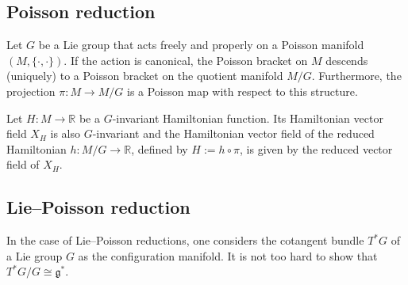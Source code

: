 \subsection{Poisson reduction}


    \begin{theorem}
        Let $G$ be a Lie group that acts freely and properly on a Poisson manifold $(M,\{\cdot,\cdot\})$. If the action is canonical, the Poisson bracket on $M$ descends (uniquely) to a Poisson bracket on the quotient manifold $M/G$. Furthermore, the projection $\pi:M\rightarrow M/G$ is a Poisson map with respect to this structure.
    \end{theorem}
    \begin{property}
        Let $H:M\rightarrow\mathbb{R}$ be a $G$-invariant Hamiltonian function. Its Hamiltonian vector field $X_H$ is also $G$-invariant and the Hamiltonian vector field of the reduced Hamiltonian $h:M/G\rightarrow\mathbb{R}$, defined by $H:=h\circ\pi$, is given by the reduced vector field of $X_H$.
    \end{property}

\subsection{Lie--Poisson reduction}

    In the case of Lie--Poisson reductions, one considers the cotangent bundle $T^*G$ of a Lie group $G$ as the configuration manifold. It is not too hard to show that $T^*G/G\cong\mathfrak{g}^*$.

